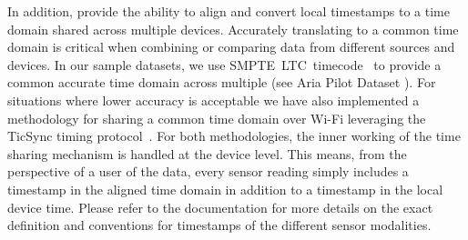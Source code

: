 In addition, \AriaDevices{} provide the ability to align and convert local timestamps to a time domain shared across multiple devices. Accurately translating to a common time domain is critical when combining or comparing data from different sources and devices. 
In our sample datasets, we use SMPTE~LTC~timecode~\cite{smptet} to provide a common accurate time domain across multiple \AriaDevices{} (see Aria Pilot Dataset \cite{ariapilot}). For situations where lower accuracy is acceptable we have also implemented a methodology for sharing a common time domain over Wi-Fi leveraging the TicSync timing protocol~\cite{conf/icra/HarrisonN11}. For both methodologies, the inner working of the time sharing mechanism is handled at the device level. This means, from the perspective of a user of the data, every sensor reading simply includes a timestamp in the aligned time domain in addition to a timestamp in the local device time.
Please refer to the  \ProjectAria{} documentation \cite{ariadocs} for more details on the exact definition and conventions for time\-stamps of the different sensor modalities. 


